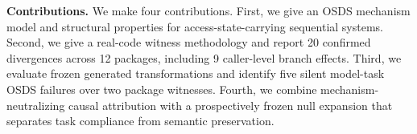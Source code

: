 \textbf{Contributions.} We make four contributions. First, we give an OSDS mechanism model and structural properties for access-state-carrying sequential systems. Second, we give a real-code witness methodology and report 20 confirmed divergences across 12 packages, including 9 caller-level branch effects. Third, we evaluate frozen generated transformations and identify five silent model-task OSDS failures over two package witnesses. Fourth, we combine mechanism-neutralizing causal attribution with a prospectively frozen null expansion that separates task compliance from semantic preservation.
